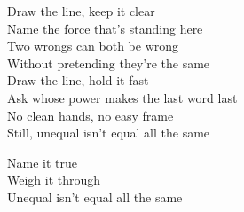 \begin{lyrics}
Draw the line, keep it clear\\
Name the force that's standing here\\
Two wrongs can both be wrong\\
Without pretending they're the same\\
Draw the line, hold it fast\\
Ask whose power makes the last word last\\
No clean hands, no easy frame\\
Still, unequal isn't equal all the same

Name it true\\
Weigh it through\\
Unequal isn't equal all the same
\end{lyrics}

